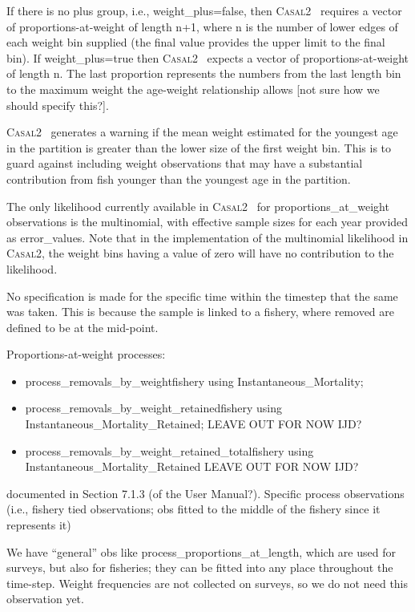 \documentclass[a4paper,11pt,twoside,pdftex,draft]{article}
\newcommand{\CNAME}{\textsc{Casal2}}
\begin{document}
If there is no plus group, i.e., weight\_plus=false, then \CNAME~ requires a vector of proportions-at-weight of length n+1, where n is the number of lower edges of each weight bin supplied (the final value provides the upper limit to the final bin). If weight\_plus=true then \CNAME~ expects a vector of proportions-at-weight of length n. The last proportion represents the numbers from the last length bin to the maximum weight the age-weight relationship allows [not sure how we should specify this?].

\CNAME~ generates a warning if the mean weight estimated for the youngest age in the partition is greater than the lower size of the first weight bin. This is to guard against including weight observations that may have a substantial contribution from fish younger than the youngest age in the partition.

The only likelihood currently available in \CNAME~ for proportions\_at\_weight observations is the multinomial, with effective sample sizes for each year provided as error\_values. Note that in the implementation of the multinomial likelihood in \CNAME, the weight bins having a value of zero will have no contribution to the likelihood.

No specification is made for the specific time within the timestep that the same was taken. This is because the sample is linked to a fishery, where removed are defined to be at the mid-point.

Proportions-at-weight processes:

\begin{itemize}
	\item process\_removals\_by\_weightfishery using Instantaneous\_Mortality;
	\item process\_removals\_by\_weight\_retainedfishery using Instantaneous\_Mortality\_Retained; LEAVE OUT FOR NOW IJD?
	\item process\_removals\_by\_weight\_retained\_totalfishery using Instantaneous\_Mortality\_Retained LEAVE OUT FOR NOW IJD?
\end{itemize}

documented in Section 7.1.3 (of the User Manual?). Specific process observations (i.e., fishery tied observations; obs fitted to the middle of the fishery since it represents it)

We have ``general'' obs like process\_proportions\_at\_length, which are used for surveys, but also for fisheries; they can be fitted into any place throughout the time-step. Weight frequencies are not collected on surveys, so we do not need this observation yet.
\end{document}
